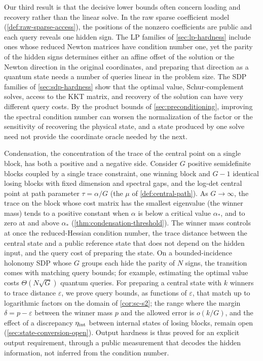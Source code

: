 Our third result is that the decisive lower bounds often concern loading and
recovery rather than the linear solve.  In the raw sparse coefficient model
(\cref{def:raw-sparse-access}), the positions of the nonzero coefficients are
public and each query reveals one hidden sign.  The LP families of
\cref{sec:lp-hardness} include ones whose reduced Newton matrices have
condition number one, yet the parity of the hidden signs determines either an affine offset
of the solution or the Newton direction in the
original coordinates, and preparing that direction as a quantum state needs
a number of queries linear in the problem size.  The SDP families of
\cref{sec:sdp-hardness} show that the optimal value, Schur-complement solves,
access to the KKT matrix, and recovery of the solution can have very
different query costs.  By the product bounds of
\cref{sec:preconditioning}, improving the spectral condition number can
worsen the normalization of the factor or the
sensitivity of recovering the physical state, and a state produced by one
solve need not provide the coordinate oracle needed by the next.

Condensation, the concentration of the trace of the central point on a
single block, has both a positive and a negative side.  Consider \(G\)
positive semidefinite blocks coupled by a single trace constraint, one
winning block and \(G-1\) identical losing blocks with fixed
dimension and spectral gaps, and the log-det central point at path
parameter \(\tau=\alpha/G\) (the \(\mu\) of \cref{def:central-path}).  As
\(G\to\infty\), the trace on the block whose
cost matrix has the smallest eigenvalue (the winner mass) tends to a positive
constant when \(\alpha\) is below a critical value \(\alpha_*\), and to zero
at and above \(\alpha_*\) (\cref{thm:condensation-threshold}).  The winner
mass controls at once the reduced-Hessian condition number, the trace
distance between the central state and a public reference state that does
not depend on the hidden input, and the query cost of preparing the state.
On a bounded-incidence holonomy SDP whose \(G\) groups each hide the parity
of \(N\) signs, the transition comes with matching query bounds; for
example, estimating the optimal value costs
\(\Theta(N\sqrt G)\) quantum queries.  For preparing a central state with
\(k\) winners to trace distance \(\varepsilon\), we prove query bounds, as
functions of \(\varepsilon\), that match up to logarithmic factors on the
domain of \cref{cor:sc-s2}; the range where the margin
\(\delta=p-\varepsilon\) between the winner mass \(p\) and the allowed error
is \(o(k/G)\), and the effect of a discrepancy \(\eta_{\rm int}\) between
internal states of losing blocks, remain open
(\cref{sec:state-conversion-open}).  Output hardness is thus proved for an
explicit output requirement, through a public measurement that decodes the
hidden information, not inferred from the
condition number.

